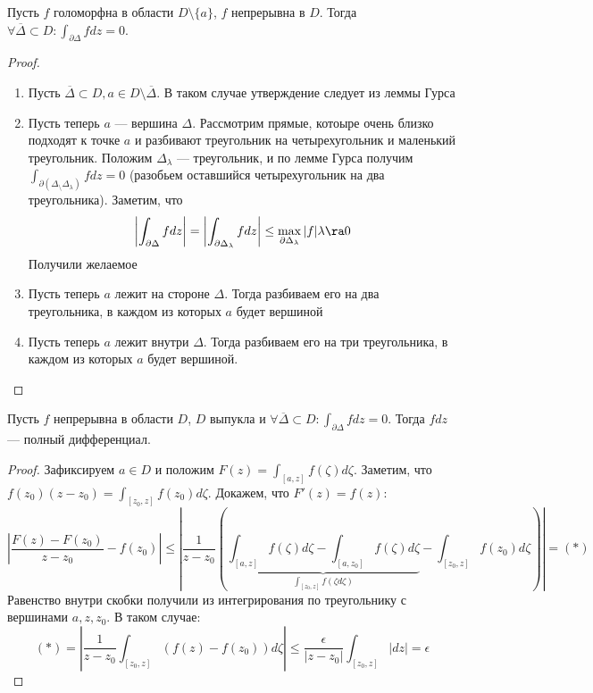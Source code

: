 \begin{lemma}
    Пусть \(f\) голоморфна в области \(D \setminus \{a\}\), \(f\) непрерывна в \(D\). Тогда \(\forall \overline{\Delta} \subset D: \int_{\partial \Delta} fdz = 0\). 
\end{lemma}
\begin{proof}
    \begin{enumerate}
        \item Пусть \(\overline{\Delta} \subset D, a \in D \setminus \overline{\Delta}\). В таком случае утверждение следует из леммы Гурса
        \item Пусть теперь \(a\) --- вершина \(\Delta\). Рассмотрим прямые, котоыре очень близко подходят к точке \(a\) и разбивают треугольник на четырехугольник и маленький треугольник. Положим \(\Delta_\lambda\) --- треугольник, и по лемме Гурса получим \(\int_{\partial (\Delta_ \setminus \Delta_\lambda)} fdz = 0\) (разобьем оставшийся четырехугольник на два треугольника). Заметим, что 
        \[\left| \int_{\partial \Delta} fdz \right| = \left| \int_{\partial \Delta_\lambda} fdz \right| \le \max_{\partial \Delta_\lambda}|f| \lambda \ra 0\]
        Получили желаемое
        \item Пусть теперь \(a\) лежит на стороне \(\Delta\). Тогда разбиваем его на два треугольника, в каждом из которых \(a\) будет вершиной
        \item Пусть теперь \(a\) лежит внутри \(\Delta\). Тогда разбиваем его на три треугольника, в каждом из которых \(a\) будет вершиной.
    \end{enumerate}
\end{proof}

\begin{lemma}
    Пусть \(f\) непрерывна в области \(D\), \(D\) выпукла и \(\forall \overline{\Delta} \subset D: \int_{\partial \Delta} fdz = 0\). Тогда \(fdz\) --- полный дифференциал.
\end{lemma}
\begin{proof}
    Зафиксируем \(a \in D\) и положим \(F(z) = \int_{[a, z]}f(\zeta)d\zeta\). Заметим, что \(f(z_0)(z - z_0) = \int_{[z_0, z]}f(z_0)d\zeta\). Докажем, что \(F'(z) = f(z)\):
    \[\left| \frac{F(z) - F(z_0)}{z - z_0} - f(z_0) \right| \le \left| \frac{1}{z - z_0} \left( \underbrace{\int_{[a, z]}f(\zeta)d\zeta - \int_{[a, z_0]}f(\zeta)d\zeta}_{\int_{[z_0, z]}f(\zeta d\zeta)} - \int_{[z_0, z]}f(z_0)d\zeta\right)\right| = (*)\]
    Равенство внутри скобки получили из интегрирования по треугольнику с вершинами \(a, z, z_0\). В таком случае:
    \[(*) = \left| \frac{1}{z - z_0} \int_{[z_0, z]}(f(z) - f(z_0))d\zeta\right| \le \frac{\epsilon}{|z - z_0|}\int_{[z_0, z]}|dz| = \epsilon\]
\end{proof}

